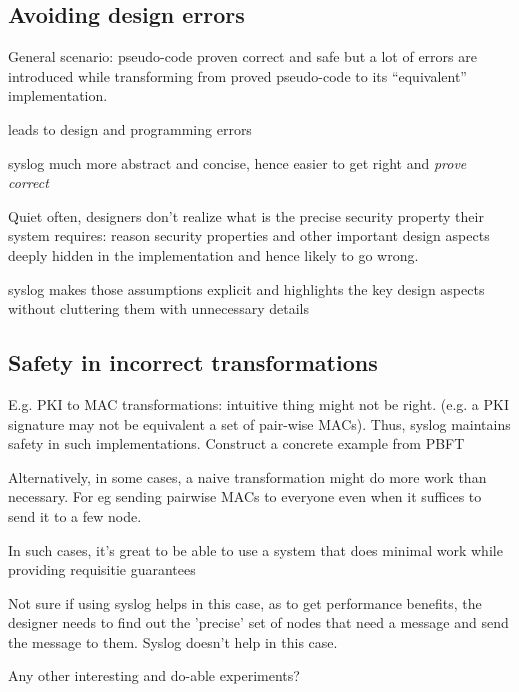 \subsection{Avoiding design errors}

General scenario: pseudo-code proven correct and safe but a lot of errors are introduced while transforming from proved pseudo-code to its ``equivalent'' implementation.
\bi 
\item leads to design and programming errors
\item syslog much more abstract and concise, hence easier to get right and {\em prove correct}
\item Quiet often, designers don't realize what is the precise security property their system requires: reason security properties and other important design aspects deeply hidden in the implementation and hence likely to go wrong.
\item syslog makes those assumptions explicit and highlights the key design aspects without cluttering them with unnecessary details
\ei

\subsection{Safety in incorrect transformations}
\bi
\item E.g. PKI to MAC transformations: intuitive thing might not be right. (e.g. a PKI signature may not be equivalent a set of pair-wise MACs). Thus, syslog maintains safety in such implementations. Construct a concrete example from PBFT

\item Alternatively, in some cases, a naive transformation might do more work than necessary. For eg sending pairwise MACs to everyone even when it suffices to send it to a few node. 
\item In such cases, it's great to be able to use a system that does minimal work while providing requisitie guarantees
\item Not sure if using syslog helps in this case, as to get performance benefits, the designer needs to find out the 'precise' set of nodes that need a message and send the message to them. Syslog doesn't help in this case.
\ei

Any other interesting and do-able experiments?



